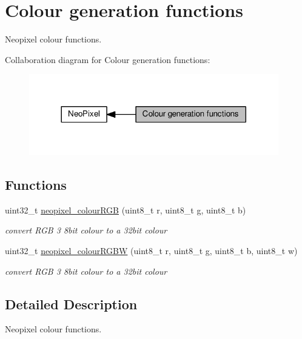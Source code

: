 \hypertarget{group___neo_pixel___colour}{}\section{Colour generation functions}
\label{group___neo_pixel___colour}


Neopixel colour functions.  


Collaboration diagram for Colour generation functions\+:\nopagebreak
\begin{figure}[H]
\begin{center}
\leavevmode
\includegraphics[width=308pt]{db/d03/group___neo_pixel___colour}
\end{center}
\end{figure}
\subsection*{Functions}
\begin{DoxyCompactItemize}
\item 
uint32\+\_\+t \hyperlink{group___neo_pixel___colour_ga1d500fbcbecad76feef8835437687ca0}{neopixel\+\_\+colour\+R\+GB} (uint8\+\_\+t r, uint8\+\_\+t g, uint8\+\_\+t b)
\begin{DoxyCompactList}\small\item\em convert R\+GB 3 8bit colour to a 32bit colour \end{DoxyCompactList}\item 
uint32\+\_\+t \hyperlink{group___neo_pixel___colour_ga527ba03b45a249e5e1ea1da4b971b3ac}{neopixel\+\_\+colour\+R\+G\+BW} (uint8\+\_\+t r, uint8\+\_\+t g, uint8\+\_\+t b, uint8\+\_\+t w)
\begin{DoxyCompactList}\small\item\em convert R\+GB 3 8bit colour to a 32bit colour \end{DoxyCompactList}\end{DoxyCompactItemize}


\subsection{Detailed Description}
Neopixel colour functions. 



